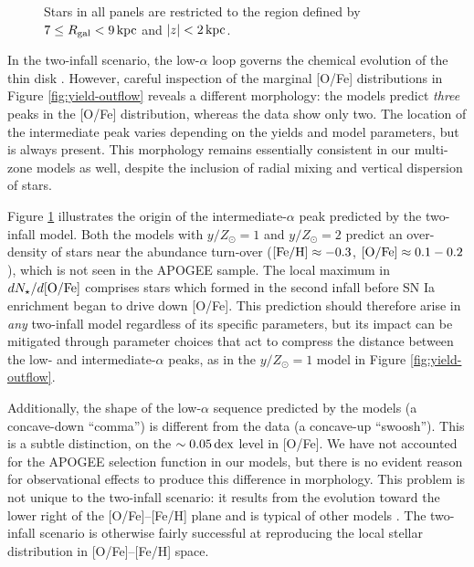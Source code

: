 \documentclass[twocolumn,twocolappendix,linenumbers]{aastex631}
\newcommand{\mathFeH}{{\rm [Fe/H]}}
\newcommand{\mathOFe}{{\rm [O/Fe]}}
\newcommand{\kpc}{\,{\rm kpc}}
\newcommand{\dex}{\,{\rm dex}}
\begin{document}
\begin{figure}
{    %
    Stars in all panels are restricted to the region defined by $7\leq R_{\rm gal}< 9\kpc$ and $|z|<2\kpc$. 
    }
    \label{fig:ofe-feh-density}
\end{figure}

In the two-infall scenario, the low-$\alpha$ loop governs the chemical evolution of the thin disk \citep[see Section 6 of][]{spitoni_galactic_2019}. However, careful inspection of the marginal [O/Fe] distributions in Figure \ref{fig:yield-outflow} reveals a different morphology: the models predict {\it three} peaks in the [O/Fe] distribution, whereas the data show only two. The location of the intermediate peak varies depending on the yields and model parameters, but is always present. This morphology remains essentially consistent in our multi-zone models as well, despite the inclusion of radial mixing and vertical dispersion of stars.

Figure \ref{fig:ofe-feh-density} illustrates the origin of the intermediate-$\alpha$ peak predicted by the two-infall model. Both the models with $y/Z_\odot=1$ and $y/Z_\odot=2$ predict an over-density of stars near the abundance turn-over ($\mathFeH\approx-0.3$, $\mathOFe\approx0.1-0.2$), which is not seen in the APOGEE sample. The local maximum in $dN_\star/d\mathOFe$ comprises stars which formed in the second infall before SN Ia enrichment began to drive down [O/Fe]. This prediction should therefore arise in {\it any} two-infall model regardless of its specific parameters, but its impact can be mitigated through parameter choices that act to compress the distance between the low- and intermediate-$\alpha$ peaks, as in the $y/Z_\odot=1$ model in Figure \ref{fig:yield-outflow}.

Additionally, the shape of the low-$\alpha$ sequence predicted by the models (a concave-down ``comma'') is different from the data (a concave-up ``swoosh''). This is a subtle distinction, on the $\sim0.05\dex$ level in [O/Fe]. We have not accounted for the APOGEE selection function in our models, but there is no evident reason for observational effects to produce this difference in morphology. This problem is not unique to the two-infall scenario: it results from the evolution toward the lower right of the [O/Fe]--[Fe/H] plane and is typical of other models \citep[e.g.,][]{minchev_chemodynamical_2013,johnson_stellar_2021,prantzos_origin_2023}. The two-infall scenario is otherwise fairly successful at reproducing the local stellar distribution in [O/Fe]--[Fe/H] space.
\end{document}
